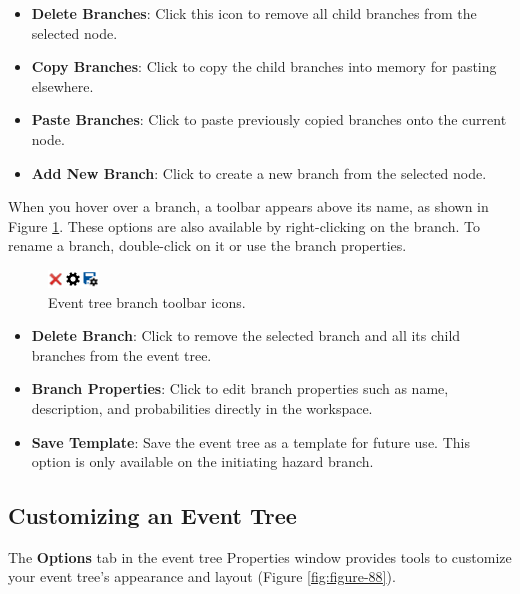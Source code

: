 \documentclass[
]{book}
\begin{document}
\begin{itemize}
\item
  \textbf{Delete Branches}: Click this icon to remove all child branches from the selected node.
\item
  \textbf{Copy Branches}: Click to copy the child branches into memory for pasting elsewhere.
\item
  \textbf{Paste Branches}: Click to paste previously copied branches onto the current node.
\item
  \textbf{Add New Branch}: Click to create a new branch from the selected node.
\end{itemize}

When you hover over a branch, a toolbar appears above its name, as shown in Figure \ref{fig:figure-87}. These options are also available by right-clicking on the branch. To rename a branch, double-click on it or use the branch properties.

\begin{figure}

{\centering \includegraphics{images/figure87} 

}

\caption{Event tree branch toolbar icons.}\label{fig:figure-87}
\end{figure}

\begin{itemize}
\item
  \textbf{Delete Branch}: Click to remove the selected branch and all its child branches from the event tree.
\item
  \textbf{Branch Properties}: Click to edit branch properties such as name, description, and probabilities directly in the workspace.
\item
  \textbf{Save Template}: Save the event tree as a template for future use. This option is only available on the initiating hazard branch.
\end{itemize}

\hypertarget{customizing-an-event-tree}{%
\subsection{Customizing an Event Tree}\label{customizing-an-event-tree}}

The \textbf{Options} tab in the event tree Properties window provides tools to customize your event tree's appearance and layout (Figure \ref{fig:figure-88}).
\end{document}
